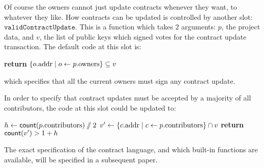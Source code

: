 Of course the owners cannot just update contracts whenever they want, to
whatever they like. How contracts can be updated is controlled by another slot:
$\mathtt{validContractUpdate}$. This is a function which takes 2 arguments: $p$,
the project data, and $v$, the list of public keys which signed votes for the
contract update transaction. The default code at this slot is:

\begin{algorithmic}[1]
\State \textbf{return} $\{ o.{\mathrm{addr}} \mid o \gets p.{\mathrm{owners}} \} \subseteq v$
\EndProcedure
\end{algorithmic}
which specifies that all the current owners must sign any contract update.

In order to specify that contract updates must be accepted by a majority of all
contributors, the code at this slot could be updated to:

\begin{algorithmic}[1]
\State $h \gets \mathsf{count}(p.{\mathrm{contributors}}) \sslash 2$
\State $v' \gets \{ c.{\mathrm{addr}} \mid c \gets p.{\mathrm{contributors}} \} \cap v$
\State \textbf{return} $\mathsf{count}(v') > 1 + h$
\EndProcedure
\end{algorithmic}

The exact specification of the contract language, and which built-in functions
are available, will be specified in a subsequent paper.
